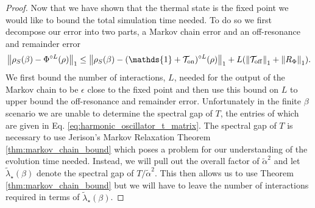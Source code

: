 \documentclass[
 amsmath,amssymb,
 aps,
onecolumn, 
nofootinbib]{revtex4-2}
\newcommand{\on}{\rm on}
\newcommand{\off}{\rm off}
\newcommand{\norm}[1]{\left\| #1 \right\|}
\newcommand{\TT}{\mathcal{T}}
\newcommand{\identity}{\mathds{1}}
\begin{document}
\begin{proof}
    Now that we have shown that the thermal state is the fixed point we would like to bound the total simulation time needed. To do so we first decompose our error into two parts, a Markov chain error and an off-resonance and remainder error
    \begin{equation}
        \norm{\rho_S(\beta) - \Phi^{\circ L}(\rho)}_1 \le \norm{\rho_S(\beta) - (\identity + \TT_{\on})^{\circ L}(\rho)}_1 + L(\norm{\TT_{\off}}_1 + \norm{R_{\Phi}}_1 ). \label{eq:harmonic_oscillator_error_breakdown}
    \end{equation}
    We first bound the number of interactions, $L$, needed for the output of the Markov chain to be $\epsilon$ close to the fixed point and then use this bound on $L$ to upper bound the off-resonance and remainder error. Unfortunately in the finite $\beta$ scenario we are unable to determine the spectral gap of $T$, the entries of which are given in Eq. \eqref{eq:harmonic_oscillator_t_matrix}.  The spectral gap of $T$ is necessary to use Jerison's Markov Relaxation Theorem \ref{thm:markov_chain_bound} which poses a problem for our understanding of the evolution time needed. Instead, we will pull out the overall factor of $\widetilde{\alpha}^2$ and let $\widetilde{\lambda}_\star(\beta)$ denote the spectral gap of $T/\widetilde{\alpha}^2$. This then allows us to use Theorem \ref{thm:markov_chain_bound} but we will have to leave the number of interactions required in terms of $\widetilde{\lambda}_\star(\beta)$.


\end{proof}
\end{document}
